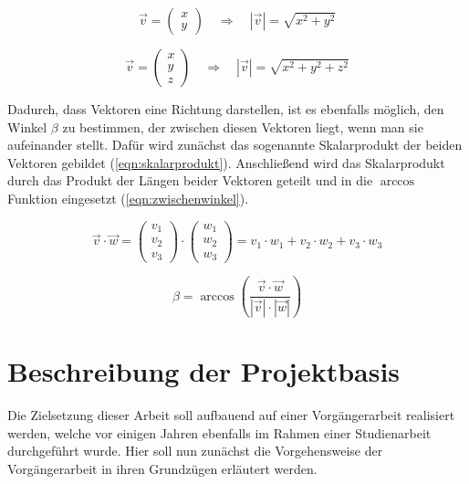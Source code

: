\begin{equation}
    \label{eqn:laenge2d}
    \overrightarrow{v} = \begin{pmatrix}x \\ y\end{pmatrix}
    \quad \Rightarrow \quad
    |\overrightarrow{v}| = \sqrt{x^2 + y^2}
\end{equation}

\begin{equation}
    \label{eqn:laenge3d}
    \overrightarrow{v} = \begin{pmatrix}x \\ y \\ z\end{pmatrix}
    \quad \Rightarrow \quad
    |\overrightarrow{v}| = \sqrt{x^2 + y^2 + z^2}
\end{equation}

Dadurch, dass Vektoren eine Richtung darstellen, ist es ebenfalls möglich, den Winkel $\beta$ zu bestimmen, der zwischen diesen Vektoren liegt, wenn man sie aufeinander stellt.
Dafür wird zunächst das sogenannte Skalarprodukt der beiden Vektoren gebildet \cite[45]{kohn2012} (\autoref{eqn:skalarprodukt}).
Anschließend wird das Skalarprodukt durch das Produkt der Längen beider Vektoren geteilt und in die $\arccos$ Funktion eingesetzt \cite[60]{kohn2012} (\autoref{eqn:zwischenwinkel}).

\begin{equation}
    \label{eqn:skalarprodukt}
    \overrightarrow{v} \cdot \overrightarrow{w} =
    \begin{pmatrix}v_1 \\ v_2 \\ v_3\end{pmatrix} \cdot \begin{pmatrix}w_1 \\ w_2 \\ w_3\end{pmatrix} =
    v_1 \cdot w_1 + v_2 \cdot w_2 + v_3 \cdot w_3
\end{equation}

\begin{equation}
    \label{eqn:zwischenwinkel}
    \beta = \arccos(\frac{\overrightarrow{v} \cdot \overrightarrow{w}}{|\overrightarrow{v}| \cdot |\overrightarrow{w}|})
\end{equation}


\section{Beschreibung der Projektbasis}
Die Zielsetzung dieser Arbeit soll aufbauend auf einer Vorgängerarbeit \cite{waidner.2020} realisiert werden, welche vor einigen Jahren ebenfalls im Rahmen einer Studienarbeit durchgeführt wurde.
Hier soll nun zunächst die Vorgehensweise der Vorgängerarbeit in ihren Grundzügen erläutert werden.

